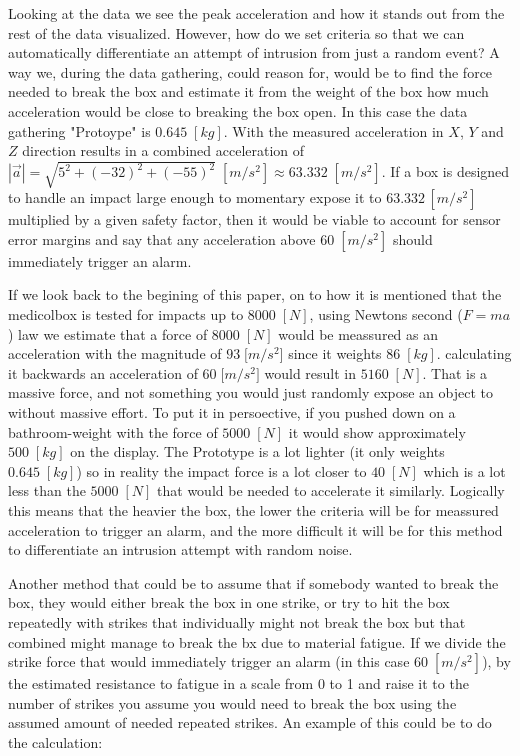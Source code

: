 \documentclass[../main.tex]{subfiles}
\begin{document}
Looking at the data we see the peak acceleration and how it
stands out from the rest of the data visualized.
However, how do we set criteria so that we can automatically differentiate an attempt of intrusion from just a random event?
A way we, during the data gathering, could reason for, would be to find the force needed to break the box and estimate it from the weight of the box how much acceleration would be close to breaking the box open. In this case the data gathering "Protoype" is $0.645\;[kg]$. With the measured acceleration in $X$, $Y$ and $Z$ direction results in a combined acceleration of $|\overrightarrow{a}| = \sqrt{5^2+(-32)^2+(-55)^2}\;[m/s^2] \approx 63.332\;[m/s^2]$. If a box is designed to handle an impact large enough to momentary expose it to $63.332\,[m/s^2]$ multiplied by a given safety factor, then it would be viable to account for sensor error margins and say that any acceleration above $60\;[m/s^2]$ should immediately trigger an alarm.

If we look back to the begining of this paper, on to how it is mentioned that
the \gls{medicolbox} is tested for impacts up to $8 000\;[N]$, using Newtons second ($F=ma$) law we estimate that a force of $8 000\;[N]$ would be meassured as an acceleration with the magnitude of $93\;[{m/s^2]}$ since it weights $86\;[kg]$. calculating it backwards an acceleration of $60\;[{m/s^2]}$ would result in $5160\;[N]$. That is a massive force, and not something you would just randomly expose an object to without massive effort. To put it in persoective, if you pushed down on a bathroom-weight with the force of $5000\;[N]$ it would show approximately $500\;[kg]$ on the display.
The Prototype is a lot lighter (it only weights $0.645\;[kg]$)
so in reality the impact force is a lot closer to $40\;[N]$ which is a lot less than the $5000\;[N]$ that would be needed to accelerate it similarly. Logically this means that the heavier the box, the lower the criteria will be for meassured acceleration to trigger an alarm, and the more difficult it will be for this method to differentiate an intrusion attempt with random noise.

Another method that could be to assume that if somebody wanted to break the box, they would either break the box in one strike, or try to hit the box repeatedly with strikes that individually might not break the box but that combined might manage to break the bx due to material fatigue. If we divide the strike force that would immediately trigger an alarm (in this case $60\;[m/s^2]$), by the estimated resistance to fatigue in a scale from 0 to 1 and raise it to the number of strikes you assume you would need to break the box using the assumed amount of needed repeated strikes. An example of this could be to do the calculation:
\end{document}
